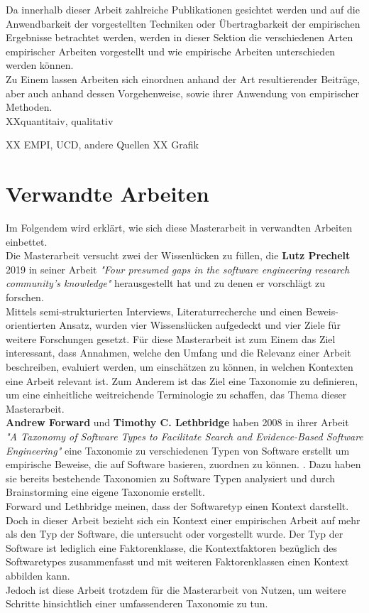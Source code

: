 Da innerhalb dieser Arbeit zahlreiche Publikationen gesichtet werden und auf die Anwendbarkeit der vorgestellten Techniken oder Übertragbarkeit der empirischen Ergebnisse betrachtet werden, werden in dieser Sektion die verschiedenen Arten empirischer Arbeiten vorgestellt und wie empirische Arbeiten unterschieden werden können. \\

Zu Einem lassen Arbeiten sich einordnen anhand der Art resultierender Beiträge, aber auch anhand dessen Vorgehenweise, sowie ihrer Anwendung von empirischer Methoden. \\

XXquantitaiv, qualitativ

XX EMPI, UCD, andere Quellen
XX Grafik


\section{Verwandte Arbeiten}
\label{sec:verwandt}

Im Folgendem wird erklärt, wie sich diese Masterarbeit in verwandten Arbeiten einbettet. \\

Die Masterarbeit versucht zwei der Wissenlücken zu füllen, die \textbf{Lutz Prechelt} 2019 in seiner Arbeit \textit{"Four presumed gaps in the software engineering research community's knowledge"} herausgestellt hat und zu denen er vorschlägt zu forschen. \cite{prechelt2019}\\
Mittels semi-strukturierten Interviews, Literaturrecherche und einen Beweis-orientierten Ansatz, wurden vier Wissenslücken aufgedeckt und vier Ziele für weitere Forschungen gesetzt. Für diese Masterarbeit ist zum Einem das Ziel interessant, dass Annahmen, welche den Umfang und die Relevanz einer Arbeit beschreiben, evaluiert werden, um einschätzen zu können, in welchen Kontexten eine Arbeit relevant ist. Zum Anderem ist das Ziel eine Taxonomie zu definieren, um eine einheitliche weitreichende Terminologie zu schaffen, das Thema dieser Masterarbeit. \\

 
\textbf{Andrew Forward} und \textbf{Timothy C. Lethbridge} haben 2008 in ihrer Arbeit \textit{"A Taxonomy of Software Types to Facilitate Search and
Evidence-Based Software Engineering"} eine Taxonomie zu verschiedenen Typen von Software erstellt um empirische Beweise, die auf Software basieren, zuordnen zu können.  \cite{taxonomy_software_types}. Dazu haben sie bereits bestehende Taxonomien zu Software Typen analysiert und durch Brainstorming eine eigene Taxonomie erstellt.\\
Forward und Lethbridge meinen, dass der Softwaretyp einen Kontext darstellt. Doch in dieser Arbeit bezieht sich ein Kontext einer empirischen Arbeit auf mehr als den Typ der Software, die untersucht oder vorgestellt wurde. Der Typ der Software ist lediglich eine Faktorenklasse, die Kontextfaktoren bezüglich des Softwaretypes zusammenfasst und mit weiteren Faktorenklassen einen Kontext abbilden kann.\\ 
Jedoch ist diese Arbeit trotzdem für die Masterarbeit von Nutzen, um weitere Schritte hinsichtlich einer umfassenderen Taxonomie zu tun. \\

